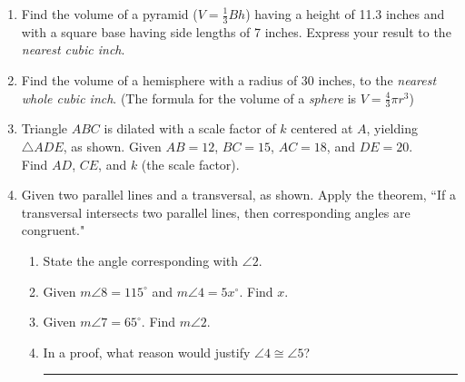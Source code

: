 \documentclass[12pt, twoside]{article}
\begin{document}
\begin{enumerate}
\item Find the volume of a pyramid ($V=\frac{1}{3}Bh$) having a height of 11.3 inches and with a square base having side lengths of 7 inches. Express your result to the \emph{nearest cubic inch}. \vspace{5cm}

\item Find the volume of a hemisphere with a radius of 30 inches, to the \emph{nearest whole cubic inch}. (The formula for the volume of a \emph{sphere} is $V=\frac{4}{3}\pi r^3$)  \vspace{5cm}

\item Triangle $ABC$ is dilated with a scale factor of $k$ centered at $A$, yielding $\triangle ADE$, as shown. Given $AB=12$, $BC=15$, $AC=18$, and $DE=20$. \\[0.25cm] Find $AD$, $CE$, and $k$ (the scale factor). \vspace{0.5cm}
\begin{center}
  \end{center}

\newpage

  \item Given two parallel lines and a transversal, as shown. Apply the theorem, ``If a transversal intersects two parallel lines, then corresponding angles are congruent."
   \begin{center}
   \end{center}
   \begin{enumerate}
     \item State the angle corresponding with $\angle 2$. \vspace{1cm}
     \item Given $m\angle 8 = 115^\circ$ and $m\angle 4 = 5x^\circ$. Find $x$. \vspace{2cm}
     \item Given $m\angle 7 = 65^\circ$. Find $m\angle 2$. \vspace{2cm}
     \item In a proof, what reason would justify $\angle 4 \cong \angle 5$? \rule{6cm}{0.15mm}
   \end{enumerate}


\end{enumerate}
\end{document}
